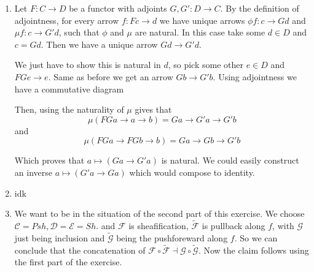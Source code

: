 \begin{exercise}{4}
    \begin{enumerate}
        \item{Let $F \colon C \rightarrow D$ be a functor with adjoints $G, G'
            \colon D \rightarrow C$. By the definition of adjointness, for every
            arrow $f \colon Fc \rightarrow d$ we have unique arrows $\phi f
            \colon c \rightarrow Gd$ and $\mu f \colon c \rightarrow G'd$, such
            that $\phi$ and $\mu$ are natural. In this case take some $d \in D$
            and $c = Gd$. Then we have a unique arrow $Gd \rightarrow G'd$.

            We just have to show this is natural in $d$, so pick some other $e
            \in D$ and $FGe \rightarrow e$. Same as before we get an arrow $Gb
            \rightarrow G'b$. Using adjointness we have a commutative diagram


            Then, using the naturality of $\mu$ gives that
            \begin{equation*}
                \mu(FGa \rightarrow a \rightarrow b) = Ga \rightarrow G'a
                \rightarrow G'b
            \end{equation*}
            and
            \begin{equation*}
                \mu(FGa \rightarrow FGb \rightarrow b) = Ga \rightarrow Gb
                \rightarrow G'b
            \end{equation*}

            Which proves that $a \mapsto (Ga \rightarrow G'a)$ is natural.
            We could easily construct an inverse $a \mapsto (G'a \rightarrow
            Ga)$ which would compose to identity.}
            \item{
                idk
            }
    \item{We want to be in the situation of the second part of
         this exercise. We choose $\mathcal{C}=Psh, \mathcal{D}=\mathcal{E}=Sh$.
         and $\mathcal{F}$ is sheafification, $\mathcal{\tilde{F}}$ is pullback
         along $f$, with $\mathcal{G}$ just being inclusion and $\tilde{\mathcal{G}}$
         being the pushforeward
         along $f$. So we can conclude that the concatenation of 
         $\mathcal{F}\circ \mathcal{\tilde{F}}\dashv \mathcal{G}\circ \mathcal{\tilde{G}}$.
         Now the claim follows using the first part of the exercise.
        }
    \end{enumerate}
\end{exercise}


